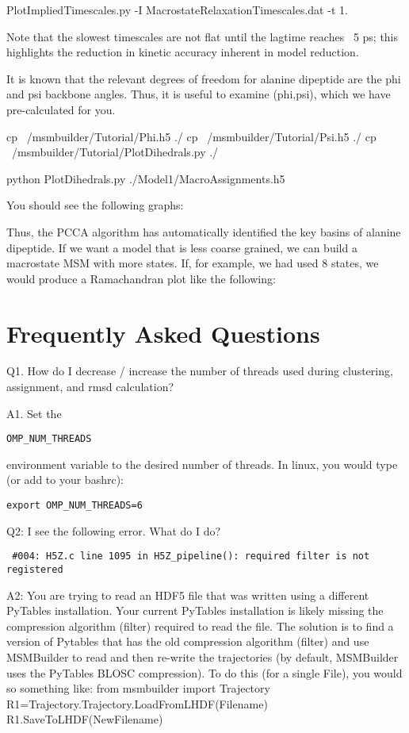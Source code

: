 \documentclass[12pt]{article}
\begin{document}
PlotImpliedTimescales.py -I MacrostateRelaxationTimescales.dat  -t 1.

Note that the slowest timescales are not flat until the lagtime reaches ~5 ps; this highlights the reduction in kinetic accuracy inherent in model reduction.  

It is known that the relevant degrees of freedom for alanine dipeptide are the phi and psi backbone angles.  Thus, it is useful to examine (phi,psi), which we have pre-calculated for you.

cp ~/msmbuilder/Tutorial/Phi.h5 ./
cp ~/msmbuilder/Tutorial/Psi.h5 ./
cp ~/msmbuilder/Tutorial/PlotDihedrals.py ./

python PlotDihedrals.py ./Model1/MacroAssignments.h5

You should see the following graphs:


Thus, the PCCA algorithm has automatically identified the key basins of alanine dipeptide.  If we want a model that is less coarse grained, we can build a macrostate MSM with more states.  If, for example, we had used 8 states, we would produce a Ramachandran plot like the following:

\newpage

\section{Frequently Asked Questions}

Q1.  How do I decrease / increase the number of threads used during clustering, assignment, and rmsd calculation?

A1.  Set the \begin{verbatim}OMP_NUM_THREADS\end{verbatim} environment variable to the desired number of threads.  In linux, you would type (or add to your bashrc):
\begin{verbatim}
export OMP_NUM_THREADS=6 
\end{verbatim}

\vspace{5mm}

Q2:  I see the following error.  What do I do?
\begin{verbatim}
 #004: H5Z.c line 1095 in H5Z_pipeline(): required filter is not registered
\end{verbatim}

A2:  You are trying to read an HDF5 file that was written using a different PyTables installation.  Your current PyTables installation is likely missing the compression algorithm (filter) required to read the file.  The solution is to find a version of Pytables that has the old compression algorithm (filter) and use MSMBuilder to read and then re-write the trajectories (by default, MSMBuilder uses the PyTables BLOSC compression).  To do this (for a single File), you would so something like:
from msmbuilder import Trajectory
R1=Trajectory.Trajectory.LoadFromLHDF(Filename)
R1.SaveToLHDF(NewFilename)
\end{document}

